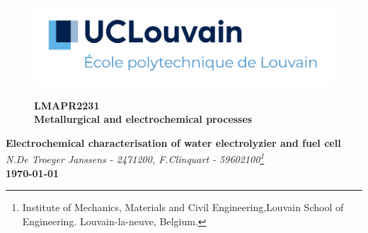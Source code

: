 \documentclass[10pt,a4paper]{article}
\begin{document}
\begin{figure}
  \begin{minipage}[t]{0.45\textwidth}
      
      \includegraphics[width=\textwidth]{Figures/EPL.png}
     
      \label{fig:EPL}
  \end{minipage}
  \hfill
  \begin{minipage}[t]{0.45\textwidth}
      \raggedleft
       \textbf{LMAPR2231\\ Metallurgical and electrochemical processes}\\
       
  
  \end{minipage}
\end{figure}
\hrulefill

\begin{center}
    \textbf{\LARGE Electrochemical characterisation of water electrolyzier and fuel cell}\\
    \vspace{0.5cm}
    \textit{\small{N.De Troeyer Janssens - 2471200, F.Clinquart - 59602100\footnote{Institute of Mechanics, Materials and Civil Engineering,Louvain School of Engineering. Louvain-la-neuve, Belgium. } }}\\
    \textbf{\small{\today}}
\end{center}








\printbibliography
\end{document}
